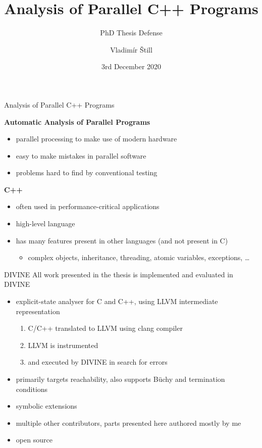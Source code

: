 \documentclass[aspectratio=169, fi]{paradise-slide}
\title{Analysis of Parallel C++ Programs}
\subtitle{PhD Thesis Defense}
\author{Vladimír Štill}
\date{3rd December 2020}
\let\otp\titlepage
\renewcommand{\titlepage}{\otp\addtocounter{framenumber}{-1}}
\begin{document}
\frame[plain]{\titlepage}

\begin{frame}{Analysis of Parallel C++ Programs}

\textbf{Automatic Analysis of Parallel Programs}
\begin{itemize}
    \item parallel processing to make use of modern hardware
    \item easy to make mistakes in parallel software
    \item problems hard to find by conventional testing
\end{itemize}
\pause

\bigskip
\textbf{C++}
\begin{itemize}
  \item often used in performance-critical applications
  \item high-level language
  \item has many features present in other languages (and not present in C)
    \pause
    \begin{itemize}
      \item complex objects, inheritance, threading, atomic variables, exceptions, …
    \end{itemize}
\end{itemize}
\end{frame}

\begin{frame}{DIVINE}
  All work presented in the thesis is implemented and evaluated in DIVINE

  \begin{itemize}
    \item explicit-state analyser for C and C++, using LLVM intermediate representation
      \begin{enumerate}
        \item C/C++ translated to LLVM using clang compiler
        \item LLVM is instrumented
        \item and executed by DIVINE in search for errors
      \end{enumerate}\pause
    \item primarily targets reachability, also supports Büchy and termination conditions
    \item symbolic extensions \pause
    \item multiple other contributors, parts presented here authored mostly by me
    \item open source
  \end{itemize}
\end{frame}
\end{document}
